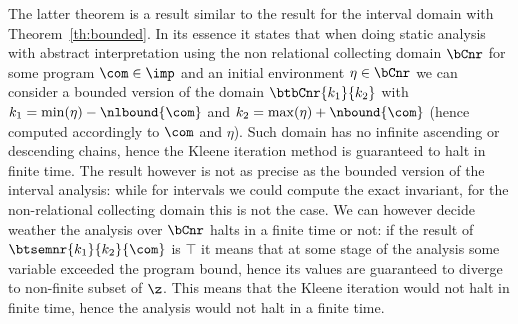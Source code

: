 The latter theorem is a result similar to the result for the interval
domain with Theorem~\ref{th:bounded}. In its essence it states that
when doing static analysis with abstract interpretation using the non
relational collecting domain \(\bCnr\) for some program
\(\com\in\imp\) and an initial environment \(\eta \in \bCnr\) we can
consider a bounded version of the domain \(\btbCnr{k_1}{k_2}\) with
\(k_1 = \min(\eta) - \nlbound{\com}\) and
\(k_2 = \max(\eta) + \nbound{\com}\) (hence computed accordingly to
\(\com\) and \(\eta\)). Such domain has no infinite ascending or
descending chains, hence the Kleene iteration method is guaranteed to
halt in finite time. The result however is not as precise as the
bounded version of the interval analysis: while for intervals we could
compute the exact invariant, for the non-relational collecting domain
this is not the case. We can however decide weather the analysis over
\(\bCnr\) halts in a finite time or not: if the result of
\(\btsemnr{k_1}{k_2}{\com}\) is \(\top\) it means that at some stage
of the analysis some variable exceeded the program bound, hence its
values are guaranteed to diverge to non-finite subset of \(\z\). This
means that the Kleene iteration would not halt in finite time, hence
the analysis would not halt in a finite time.
